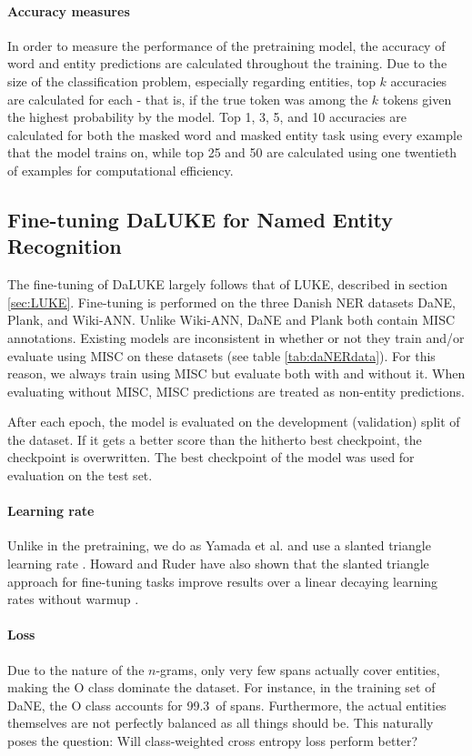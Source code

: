 \documentclass[main.tex]{subfiles}
\begin{document}
\paragraph{Accuracy measures}
In order to measure the performance of the pretraining model, the accuracy of word and entity predictions are calculated throughout the training.
Due to the size of the classification problem, especially regarding entities, top $ k $ accuracies are calculated for each - that is, if the true token was among the $ k $ tokens given the highest probability by the model.
Top 1, 3, 5, and 10 accuracies are calculated for both the masked word and masked entity task using every example that the model trains on, while top 25 and 50 are calculated using one twentieth of examples for computational efficiency.

\subsection{Fine-tuning DaLUKE for Named Entity Recognition}%
\label{sub:finetune-ner}
The fine-tuning of DaLUKE largely follows that of LUKE, described in section \ref{sec:LUKE}.
Fine-tuning is performed on the three Danish NER datasets DaNE, Plank, and Wiki-ANN.
Unlike Wiki-ANN, DaNE and Plank both contain MISC annotations.
Existing models are inconsistent in whether or not they train and/or evaluate using MISC on these datasets (see table \ref{tab:daNERdata}).
For this reason, we always train using MISC but evaluate both with and without it.
When evaluating without MISC, MISC predictions are treated as non-entity predictions.

After each epoch, the model is evaluated on the development (validation) split of the dataset.
If it gets a better score than the hitherto best checkpoint, the checkpoint is overwritten.
The best checkpoint of the model was used for evaluation on the test set.

\paragraph{Learning rate}
Unlike in the pretraining, we do as Yamada et al. and use a slanted triangle learning rate \cite{yamada2020luke}.
Howard and Ruder have also shown that the slanted triangle approach for fine-tuning tasks improve results over a linear decaying learning rates without warmup \cite{howardruder2018universal}.

\paragraph{Loss}
Due to the nature of the $ n $-grams, only very few spans actually cover entities, making the O class dominate the dataset.
For instance, in the training set of DaNE, the O class accounts for 99.3\pro\ of spans.
Furthermore, the actual entities themselves are not perfectly balanced as all things should be.
This naturally poses the question: Will class-weighted cross entropy loss perform better?
\end{document}
